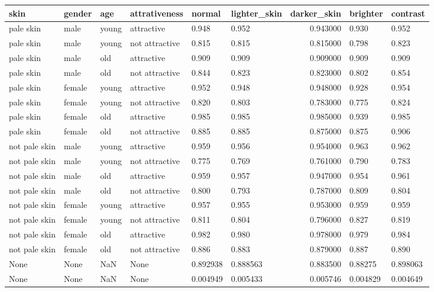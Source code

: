 \begin{tabular}{llllllrll}
\toprule
         skin & gender &   age &  attrativeness &    normal & lighter\_skin &  darker\_skin &  brighter &  contrast \\
\midrule
    pale skin &   male & young &     attractive &     0.948 &        0.952 &     0.943000 &     0.930 &     0.952 \\
    pale skin &   male & young & not attractive &     0.815 &        0.815 &     0.815000 &     0.798 &     0.823 \\
    pale skin &   male &   old &     attractive &     0.909 &        0.909 &     0.909000 &     0.909 &     0.909 \\
    pale skin &   male &   old & not attractive &     0.844 &        0.823 &     0.823000 &     0.802 &     0.854 \\
    pale skin & female & young &     attractive &     0.952 &        0.948 &     0.948000 &     0.928 &     0.954 \\
    pale skin & female & young & not attractive &     0.820 &        0.803 &     0.783000 &     0.775 &     0.824 \\
    pale skin & female &   old &     attractive &     0.985 &        0.985 &     0.985000 &     0.939 &     0.985 \\
    pale skin & female &   old & not attractive &     0.885 &        0.885 &     0.875000 &     0.875 &     0.906 \\
not pale skin &   male & young &     attractive &     0.959 &        0.956 &     0.954000 &     0.963 &     0.962 \\
not pale skin &   male & young & not attractive &     0.775 &        0.769 &     0.761000 &     0.790 &     0.783 \\
not pale skin &   male &   old &     attractive &     0.959 &        0.957 &     0.947000 &     0.954 &     0.961 \\
not pale skin &   male &   old & not attractive &     0.800 &        0.793 &     0.787000 &     0.809 &     0.804 \\
not pale skin & female & young &     attractive &     0.957 &        0.955 &     0.953000 &     0.959 &     0.959 \\
not pale skin & female & young & not attractive &     0.811 &        0.804 &     0.796000 &     0.827 &     0.819 \\
not pale skin & female &   old &     attractive &     0.982 &        0.980 &     0.978000 &     0.979 &     0.984 \\
not pale skin & female &   old & not attractive &     0.886 &        0.883 &     0.879000 &     0.887 &     0.890 \\
         None &   None &   NaN &           None &  0.892938 &     0.888563 &     0.883500 &   0.88275 &  0.898063 \\
         None &   None &   NaN &           None &  0.004949 &     0.005433 &     0.005746 &  0.004829 &  0.004649 \\
\bottomrule
\end{tabular}
